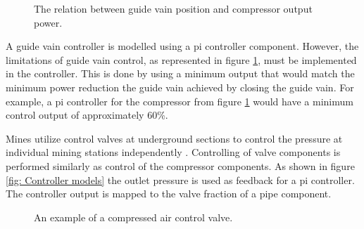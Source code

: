 		\begin{figure}[h]
			\centering
			\fbox{}
			\caption[The relation between guide vain position and compressor output power.]{The relation between guide vain position and compressor output power.}
			\label{fig: Guide vain position}
		\end{figure}
		\par
		A guide vain controller is modelled using a \gls{pi} controller component. However, the limitations of guide vain control, as represented in figure \ref{fig: Guide vain position}, must be implemented in the controller. This is done by using a minimum output that would match the minimum power reduction the guide vain achieved by closing the guide vain. For example, a \gls{pi} controller for the compressor from figure \ref{fig: Guide vain position} would have a minimum control output of approximately 60\%.
		\par 
		Mines utilize control valves at underground sections to control the pressure at individual mining stations independently \cite{Heyns2014Masters}. Controlling of valve components is performed similarly as control of the compressor components. As shown in figure \ref{fig: Controller models} the outlet pressure is used as feedback for a pi controller. The controller output is mapped to the valve fraction of a pipe component.
		\begin{figure}[h]
			\centering
			\caption[An example of a compressed air control valve.]{An example of a compressed air control valve\cite{van2015implementation}.} 
			\label{fig: Control}
		\end{figure}
